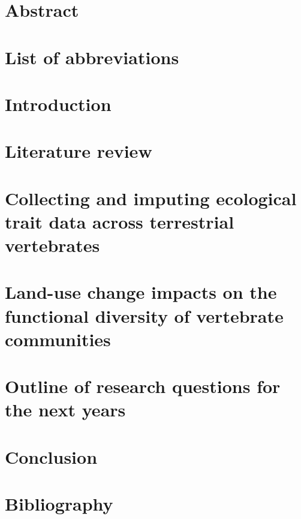 \documentclass[11pt]{report}
\begin{document}




\chapter*{Abstract}


\clearpage
\tableofcontents


\clearpage
\listoftables

\listoffigures



\chapter*{List of abbreviations}


\clearpage
\chapter{Introduction}
%

\chapter{Literature review}
%

\pagebreak
\chapter{Collecting and imputing ecological trait data across terrestrial vertebrates}


\chapter{Land-use change impacts on the functional diversity of vertebrate communities}


\chapter{Outline of research questions for the next years}


\chapter{Conclusion}

\clearpage
\chapter*{Bibliography}
\printbibliography[heading=none]
\end{document}
